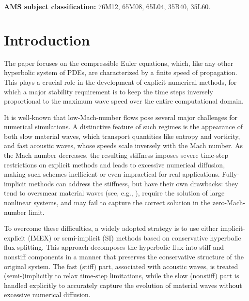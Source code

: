 \documentclass[A4paper,12pt,twoside]{article}
\numberwithin{equation}{section}
\numberwithin{figure}{section}
\numberwithin{table}{section}
\newcommand{\lore}[1]{{\leavevmode\color{red} #1}}
\begin{document}
\medskip
\noindent
{\bf AMS subject classification:} 76M12, 65M08, 65L04, 35B40, 35L60.

\section{Introduction}%
The paper focuses on \lore{the} compressible Euler equations, which, like any other hyperbolic system of PDEs, are characterized by a finite speed of
propagation. This plays a crucial role in the development of explicit numerical methods, for which a major stability requirement is to keep
the time steps inversely proportional to the maximum wave speed over the entire computational domain.

It is well-known that low-Mach-number flows pose several major challenges for numerical simulations. A distinctive feature of such regimes is
the appearance of both slow material waves, which transport quantities like entropy and vorticity, and fast acoustic waves, whose speeds
scale inversely with the Mach number. As the Mach number decreases, the resulting stiffness imposes severe time-step restrictions on
explicit methods and leads to excessive numerical diffusion, making such schemes inefficient or even impractical for real applications.
Fully-implicit methods can address the stiffness, but have their own drawbacks: they tend to oversmear material waves (see, e.g.,
\cite{boscarino2018all}), require the solution of large nonlinear systems, and may fail to capture the correct solution in the
zero-Mach-number limit.

To overcome these difficulties, a widely adopted strategy is to use either implicit-explicit (IMEX) or semi-implicit (SI) methods based on
conservative hyperbolic flux splitting. This approach decomposes the hyperbolic flux into stiff and nonstiff components in a manner that
preserves the conservative structure of the original system. The fast (stiff) part, associated with acoustic waves, is treated
(semi-)implicitly to relax time-step limitations, while the slow (nonstiff) part is handled explicitly to accurately capture the evolution
of material waves without excessive numerical diffusion.
\end{document}
